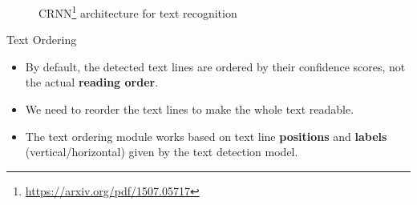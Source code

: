 \documentclass{beamer}
\begin{document}
\begin{frame}
\begin{figure}[htbp]
        \caption{CRNN\footnote{\url{https://arxiv.org/pdf/1507.05717}} architecture for text recognition}
        \label{fig:crnn}
    \end{figure}
\end{frame}

\begin{frame}
    \begin{center}
        \Large{Text Ordering}
    \end{center}
    \begin{itemize}
        \item By default, the detected text lines are ordered by their confidence scores, not the actual \textbf{reading order}.
        \item We need to reorder the text lines to make the whole text readable.
        \item The text ordering module works based on text line \textbf{positions} and \textbf{labels} (vertical/horizontal) given by the text detection model.
    \end{itemize}
\end{frame}
\end{document}
